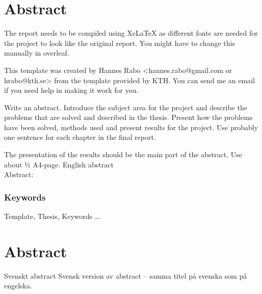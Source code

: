 \newpage
\thispagestyle{plain}
\chapter*{Abstract}


The report needs to be compiled using XeLaTeX as different fonts are needed for the project to look like the original report. You might have to change this manually in overleaf.

This template was created by Hannes Rabo <hannes.rabo@gmail.com or hrabo@kth.se> from the template provided by KTH. You can send me an email if you need help in making it work for you.


\vspace{2cm}
Write an abstract. Introduce the subject area for the project and describe the problems that are solved and described in the thesis. Present how the problems have been solved, methods used and present results for the project. Use probably one sentence for each chapter in the final report.

The presentation of the results should be the main part of the abstract. Use about ½ A4-page.
English abstract\\

Abstract:



\subsection*{Keywords}
Template, Thesis, Keywords ...





\newpage
\thispagestyle{plain}
\chapter*{Abstract}
Svenskt abstract
Svensk version av abstract – samma titel på svenska som på engelska.

